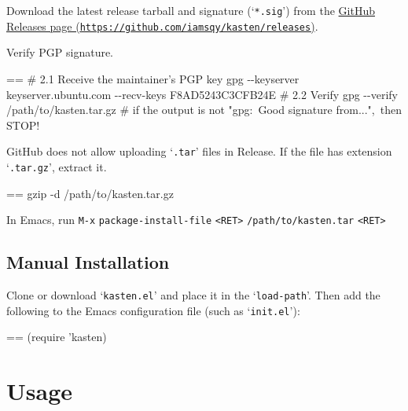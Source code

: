 \documentclass{book}
\makeatletter
\newenvironment{Texinfopreformatted}{%
  \par\GNUTobeylines\obeyspaces\frenchspacing\parskip=\z@\parindent=\z@}{}
{\catcode`\^^M=13 \gdef\GNUTobeylines{\catcode`\^^M=13 \def^^M{\null\par}}}
\newenvironment{Texinfoindented}{\begin{list}{}{}\item\relax}{\end{list}}
\renewcommand{\_}{\Texinfounderscore\discretionary{}{}{}}
\makeatother
\begin{document}
\begin{enumerate}[start=1]
\item Download the latest release tarball and signature (`\texttt{*.sig}') from the \href{https://github.com/iamsqy/kasten/releases}{GitHub
Releases page (\nolinkurl{https://github.com/iamsqy/kasten/releases})}.
\item Verify PGP signature.
\begin{Texinfoindented}
\begin{Texinfopreformatted}%
\ttfamily \# 2.1 Receive the maintainer's PGP key
gpg {-}{-}keyserver keyserver.ubuntu.com {-}{-}recv-keys F8AD5243C3CFB24E
\# 2.2 Verify
gpg {-}{-}verify /path/to/kasten.tar.gz
\# if the output is not "gpg:\ Good signature from...",\ then STOP!
\end{Texinfopreformatted}
\end{Texinfoindented}
\item GitHub does not allow uploading `\texttt{.tar}' files in Release. If the
file has extension `\texttt{.tar.gz}', extract it.
\begin{Texinfoindented}
\begin{Texinfopreformatted}%
\ttfamily gzip -d /path/to/kasten.tar.gz
\end{Texinfopreformatted}
\end{Texinfoindented}
\item In Emacs, run
\texttt{M-x} \texttt{package-install-file} \texttt{<RET>} \texttt{/path/to/kasten.tar} \texttt{<RET>}
\end{enumerate}

\section{{Manual Installation}}
\label{anchor:Manual-Installation}%

Clone or download `\texttt{kasten.el}' and place it in the `\texttt{load-path}'. Then add the
following to the Emacs configuration file (such as `\texttt{init.el}'):

\begin{Texinfoindented}
\begin{Texinfopreformatted}%
\ttfamily (require 'kasten)
\end{Texinfopreformatted}
\end{Texinfoindented}

\chapter{{Usage}}
\label{anchor:Usage}%
\end{document}
